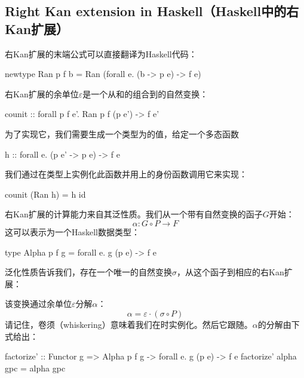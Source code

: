 \documentclass[DaoFP]{subfiles}
\begin{document}
 \subsection{Right Kan extension in Haskell（Haskell中的右Kan扩展）}

 右Kan扩展的末端公式可以直接翻译为Haskell代码：
 \begin{haskell}
  newtype Ran p f b = Ran (forall e. (b -> p e) -> f e)
 \end{haskell}

 右Kan扩展的余单位$\varepsilon$是一个从和的组合到的自然变换：
 \begin{haskell}
  counit :: forall p f e'. Ran p f (p e') -> f e'
 \end{haskell}
 为了实现它，我们需要生成一个类型为的值，给定一个多态函数
 \begin{haskell}
  h :: forall e. (p e' -> p e) -> f e
 \end{haskell}
 我们通过在类型上实例化此函数并用上的身份函数调用它来实现：
 \begin{haskell}
  counit (Ran h) = h id
 \end{haskell}

 右Kan扩展的计算能力来自其泛性质。我们从一个带有自然变换的函子$G$开始：
 \[ \alpha \colon G \circ P \to F \]
 这可以表示为一个Haskell数据类型：
 \begin{haskell}
  type Alpha p f g = forall e. g (p e) -> f e
 \end{haskell}
 泛化性质告诉我们，存在一个唯一的自然变换$\sigma$，从这个函子到相应的右Kan扩展：
 该变换通过余单位$\varepsilon$分解$\alpha$：
\[ \alpha = \varepsilon \cdot (\sigma \circ P) \]
请记住，卷须（whiskering）意味着我们在时实例化。然后它跟随。$\alpha$的分解由下式给出：
\begin{haskell}
factorize' :: Functor g => Alpha p f g -> forall e. g (p e) -> f e
factorize' alpha gpc = alpha gpc
\end{haskell}
\end{document}
